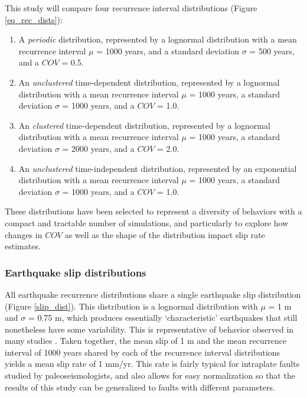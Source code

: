 \documentclass[se, manuscript]{copernicus}
\begin{document}
This study will compare four recurrence interval distributions (Figure
\ref{eq_rec_dists}):

\begin{enumerate}
\def\labelenumi{\arabic{enumi}.}
\item
  A \emph{periodic} distribution, represented by a lognormal
  distribution with a mean recurrence interval \(\mu\) = 1000 years, and
  a standard deviation \(\sigma\) = 500 years, and a \(COV\) = 0.5.
\item
  An \emph{unclustered} time-dependent distribution, represented by a
  lognormal distribution with a mean recurrence interval \(\mu\) = 1000
  years, a standard deviation \(\sigma\) = 1000 years, and a \(COV\) =
  1.0.
\item
  An \emph{clustered} time-dependent distribution, represented by a
  lognormal distribution with a mean recurrence interval \(\mu\) = 1000
  years, a standard deviation \(\sigma\) = 2000 years, and a \(COV\) =
  2.0.
\item
  An \emph{unclustered} time-independent distribution, represented by an
  exponential distribution with a mean recurrence interval \(\mu\) =
  1000 years, a standard deviation \(\sigma\) = 1000 years, and a
  \(COV\) = 1.0.
\end{enumerate}

These distributions have been selected to represent a diversity of
behaviors with a compact and tractable number of simulations, and
particularly to explore how changes in \(COV\) as well as the shape of
the distribution impact slip rate estimates.

\subsubsection{Earthquake slip
distributions}\label{earthquake-slip-distributions}

All earthquake recurrence distributions share a single earthquake slip
distribution (Figure \ref{slip_dist}). This distribution is a lognormal
distribution with \(\mu\) = 1 m and \(\sigma\) = 0.75 m, which produces
essentially `characteristic' earthquakes that still nonetheless have
some variability. This is representative of behavior observed in many
studies \citep[e.g.]{zielke_slip_2010, klinger_characteristic_2011,
  zielke_earthquake_2018}. Taken together, the mean slip of 1 m and the
mean recurrence interval of 1000 years shared by each of the recurrence
interval distributions yields a mean slip rate of 1 mm/yr. This rate is
fairly typical for intraplate faults studied by paleoseismologists, and
also allows for easy normalization so that the results of this study can
be generalized to faults with different parameters.
\end{document}
